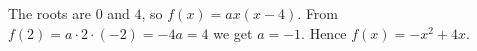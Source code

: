 The roots are $0$ and $4$, so $f(x)=ax(x-4)$. From $f(2)=a\cdot2\cdot(-2)=-4a=4$ we get $a=-1$. Hence $\boxed{f(x)=-x^2+4x}$.
